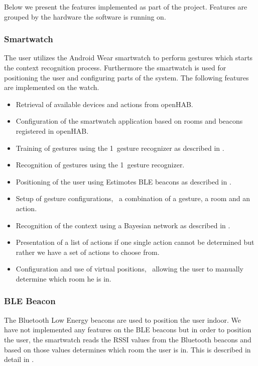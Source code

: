 Below we present the features implemented as part of the project. Features are grouped by the hardware the software is running on.

\subsubsection{Smartwatch}

The user utilizes the Android Wear smartwatch to perform gestures which starts the context recognition process. Furthermore the smartwatch is used for positioning the user and configuring parts of the system. The following features are implemented on the watch.

\begin{itemize}
\item Retrieval of available devices and actions from openHAB.
\item Configuration of the smartwatch application based on rooms and beacons registered in openHAB.
\item Training of gestures using the 1\textcent~gesture recognizer as described in .
\item Recognition of gestures using the 1\textcent~gesture recognizer.
\item Positioning of the user using Estimotes BLE beacons as described in .
\item Setup of gesture configurations, \ie~a combination of a gesture, a room and an action.
\item Recognition of the context using a Bayesian network as described in .
\item Presentation of a list of actions if one single action cannot be determined but rather we have a set of actions to choose from.
\item Configuration and use of virtual positions, \ie~allowing the user to manually determine which room he is in.
\end{itemize}

\subsubsection{BLE Beacon}

The Bluetooth Low Energy beacons are used to position the user indoor. We have not implemented any features on the BLE beacons but in order to position the user, the smartwatch reads the RSSI values from the Bluetooth beacons and based on those values determines which room the user is in. This is described in detail in .

